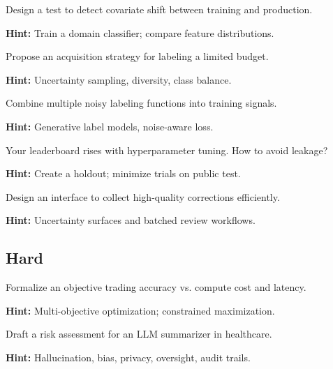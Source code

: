 \begin{problem}
Design a test to detect covariate shift between training and production.

\textbf{Hint:} Train a domain classifier; compare feature distributions.
\end{problem}

\begin{problem}
Propose an acquisition strategy for labeling a limited budget.

\textbf{Hint:} Uncertainty sampling, diversity, class balance.
\end{problem}

\begin{problem}
Combine multiple noisy labeling functions into training signals.

\textbf{Hint:} Generative label models, noise-aware loss.
\end{problem}

\begin{problem}
Your leaderboard rises with hyperparameter tuning. How to avoid leakage?

\textbf{Hint:} Create a holdout; minimize trials on public test.
\end{problem}

\begin{problem}
Design an interface to collect high-quality corrections efficiently.

\textbf{Hint:} Uncertainty surfaces and batched review workflows.
\end{problem}

\subsection*{Hard}

\begin{problem}
Formalize an objective trading accuracy vs. compute cost and latency.

\textbf{Hint:} Multi-objective optimization; constrained maximization.
\end{problem}

\begin{problem}
Draft a risk assessment for an LLM summarizer in healthcare.

\textbf{Hint:} Hallucination, bias, privacy, oversight, audit trails.
\end{problem}

